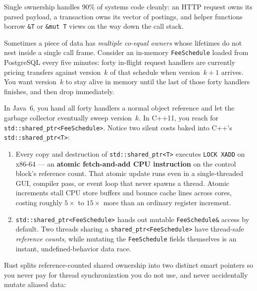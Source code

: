 Single ownership handles 90\% of systems code cleanly: an HTTP request owns its parsed payload, a transaction owns its vector of postings, and helper functions borrow \texttt{\&T} or \texttt{\&mut T} views on the way down the call stack.

Sometimes a piece of data has \emph{multiple co-equal owners} whose lifetimes do not nest inside a single call frame. Consider an in-memory \texttt{FeeSchedule} loaded from PostgreSQL every five minutes: forty in-flight request handlers are currently pricing transfers against version~$k$ of that schedule when version~$k+1$ arrives. You want version~$k$ to stay alive in memory until the last of those forty handlers finishes, and then drop immediately.

In Java~6, you hand all forty handlers a normal object reference and let the garbage collector eventually sweep version~$k$. In C++11, you reach for \texttt{std::shared\_ptr<FeeSchedule>}. Notice two silent costs baked into C++'s \texttt{std::shared\_ptr<T>}:
\begin{enumerate}
  \item Every copy and destruction of \texttt{std::shared\_ptr<T>} executes \texttt{LOCK XADD} on x86-64 --- an \textbf{atomic fetch-and-add CPU instruction} on the control block's reference count. That atomic update runs even in a single-threaded GUI, compiler pass, or event loop that never spawns a thread. Atomic increments stall CPU store buffers and bounce cache lines across cores, costing roughly $5\times$ to $15\times$ more than an ordinary register increment.
  \item \texttt{std::shared\_ptr<FeeSchedule>} hands out mutable \texttt{FeeSchedule\&} access by default. Two threads sharing a \texttt{shared\_ptr<FeeSchedule>} have thread-safe \emph{reference counts}, while mutating the \texttt{FeeSchedule} fields themselves is an instant, undefined-behavior data race.
\end{enumerate}

Rust splits reference-counted shared ownership into two distinct smart pointers so you never pay for thread synchronization you do not use, and never accidentally mutate aliased data:

